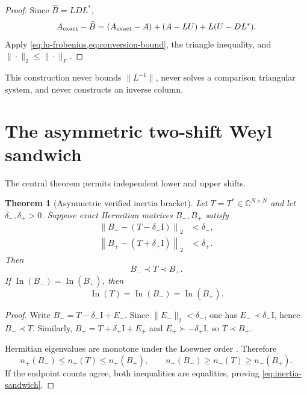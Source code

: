 \documentclass[11pt]{article}
\newtheorem{theorem}{Theorem}[section]
\theoremstyle{definition}
\theoremstyle{remark}
\newcommand{\C}{\mathbb C}
\newcommand{\Id}{\mathrm I}
\newcommand{\norm}[1]{\left\lVert#1\right\rVert}
\newcommand{\Bhat}{\widehat B}
\newcommand{\inn}{\operatorname{In}}
\begin{document}
\begin{proof}
Since $\Bhat=LDL^*$,
\[
 A_{\rm exact}-\Bhat
 =(A_{\rm exact}-A)+(A-LU)+L(U-DL^*).
\]
Apply \cref{eq:lu-frobenius,eq:conversion-bound}, the triangle inequality,
and $\|\cdot\|_2\leq\|\cdot\|_F$.
\end{proof}

This construction never bounds $\|L^{-1}\|$, never solves a comparison
triangular system, and never constructs an inverse column.


\section{The asymmetric two-shift Weyl sandwich}
\label{sec:weyl}

The central theorem permits independent lower and upper shifts.

\begin{theorem}[Asymmetric verified inertia bracket]
\label{thm:asymmetric-bracket}
Let $T=T^*\in\C^{N\times N}$ and let $\delta_-,\delta_+>0$.  Suppose exact
Hermitian matrices $B_-,B_+$ satisfy
\begin{align}
 \norm{B_--(T-\delta_-\Id)}_2&<\delta_-,
 \label{eq:lower-condition}\\
 \norm{B_+-(T+\delta_+\Id)}_2&<\delta_+.
 \label{eq:upper-condition}
\end{align}
Then
\begin{equation}
 B_-\prec T\prec B_+.
 \label{eq:loewner-sandwich}
\end{equation}
If $\inn(B_-)=\inn(B_+)$, then
\begin{equation}
 \inn(T)=\inn(B_-)=\inn(B_+).
 \label{eq:inertia-sandwich}
\end{equation}
\end{theorem}

\begin{proof}
Write $B_-=T-\delta_-\Id+E_-$.
Since $\|E_-\|_2<\delta_-$, one has
$E_-\prec\delta_-\Id$, hence $B_-\prec T$.
Similarly, $B_+=T+\delta_+\Id+E_+$ and
$E_+\succ-\delta_+\Id$, so $T\prec B_+$.

Hermitian eigenvalues are monotone under the Loewner order
\citep{HornJohnson2013}.  Therefore
\[
 n_+(B_-)\leq n_+(T)\leq n_+(B_+),
 \qquad
 n_-(B_-)\geq n_-(T)\geq n_-(B_+).
\]
If the endpoint counts agree, both inequalities are equalities, proving
\cref{eq:inertia-sandwich}.
\end{proof}
\end{document}
